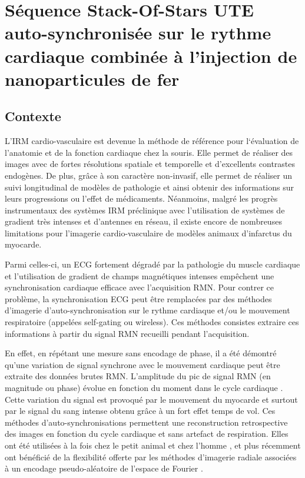 \chapter{Séquence Stack-Of-Stars UTE auto-synchronisée sur le rythme cardiaque combinée à l'injection de nanoparticules de fer}
\setlength{\footskip}{50pt}
\label{Chap5}
\section{Contexte}

L’IRM cardio-vasculaire est devenue la méthode de référence pour l‘évaluation de l’anatomie et de la fonction cardiaque chez la souris. Elle permet de réaliser des images avec de fortes résolutions spatiale et temporelle et d’excellents contrastes endogènes. De plus, grâce à son caractère non-invasif, elle permet de réaliser un suivi longitudinal de modèles de pathologie et ainsi obtenir des informations sur leurs progressions ou l’effet de médicaments.
Néanmoins, malgré les progrès instrumentaux des systèmes IRM préclinique avec l’utilisation de systèmes de gradient très intenses et d’antennes en réseau, il existe encore de nombreuses limitations pour l’imagerie cardio-vasculaire de modèles animaux d’infarctus du myocarde.

Parmi celles-ci, un ECG fortement dégradé par la pathologie du muscle cardiaque et l’utilisation de gradient de champs magnétiques intenses empêchent une synchronisation cardiaque efficace avec l’acquisition RMN. Pour contrer ce problème, la synchronisation ECG peut être remplacées par des méthodes d’imagerie d’auto-synchronisation sur le rythme cardiaque et/ou le mouvement respiratoire \cite{spraggins1990wireless,kim1990extraction}(appelées self-gating ou wireless). Ces méthodes consistes extraire ces informations à partir du signal RMN recueilli pendant l'acquisition.

En effet, en répétant une mesure sans encodage de phase, il a été démontré qu’une variation de signal synchrone avec le mouvement cardiaque peut être extraite des données brutes RMN. L’amplitude du pic de signal RMN (en magnitude ou phase) évolue en fonction du moment dans le cycle cardiaque \cite{Larson2004Self-gated-card,crowe2004automated}. Cette variation du signal est provoqué par le mouvement du myocarde et surtout par le signal du sang intense obtenu grâce à un fort effet temps de vol. Ces méthodes d'auto-synchronisations permettent une reconstruction retrospective des images en fonction du cycle cardiaque et sans artefact de respiration. Elles ont été utilisées à la fois chez le petit animal \cite{hiba2006cardiac,Heijman:2007aa,Hiba:2007aa,Bovens:2011aa} et chez l’homme \cite{Larson:2005aa,crowe2004automated,ingle2015self}, et plus récemment ont bénéficié de la flexibilité offerte par les méthodes d’imagerie radiale associées à un encodage pseudo-aléatoire de l’espace de Fourier \cite{Konstandin:2011fk,kramer2014retrospective,kramer2015self,paul2015high,Motaal:2015aa}. 

